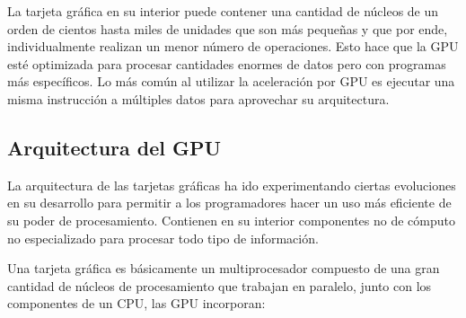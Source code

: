    \vspace{0.3cm}
   
   La tarjeta gráfica en su interior puede contener una cantidad de núcleos de un orden de cientos hasta miles de unidades que son más pequeñas y que por ende, individualmente realizan un menor número de operaciones. Esto hace que la GPU esté optimizada para procesar cantidades enormes de datos pero con programas más específicos\cite{gpgpu}. Lo más común al utilizar la aceleración por GPU es ejecutar una misma instrucción a múltiples datos para aprovechar su arquitectura.
   
    \subsection{Arquitectura del GPU}

La arquitectura de las tarjetas gráficas ha ido experimentando ciertas evoluciones en su desarrollo para permitir a los programadores hacer un uso más eficiente de su poder de procesamiento. Contienen en su interior componentes no de cómputo no especializado para procesar todo tipo de información.

Una tarjeta gráfica es básicamente un multiprocesador compuesto de una gran cantidad de núcleos de procesamiento que trabajan en paralelo, junto con los componentes de un CPU, las GPU incorporan:

